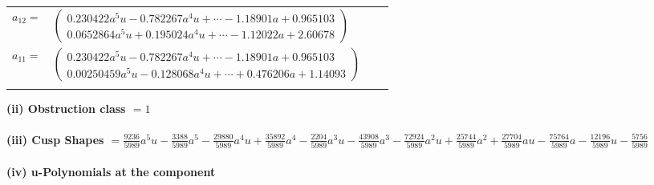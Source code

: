 \documentclass[1p]{elsarticle_modified}
\theoremstyle{definition}
\begin{document}
\begin{tabular}{m{7pt} m{180pt} m{7pt} m{180pt} }
\flushright $a_{12}=$&$\begin{pmatrix}0.230422 a^{5} u-0.782267 a^{4} u+\cdots-1.18901 a+0.965103\\0.0652864 a^{5} u+0.195024 a^{4} u+\cdots-1.12022 a+2.60678\end{pmatrix}$ \\
\flushright $a_{11}=$&$\begin{pmatrix}0.230422 a^{5} u-0.782267 a^{4} u+\cdots-1.18901 a+0.965103\\0.00250459 a^{5} u-0.128068 a^{4} u+\cdots+0.476206 a+1.14093\end{pmatrix}$\\&\end{tabular}
\flushleft \textbf{(ii) Obstruction class $= 1$}\\~\\
\flushleft \textbf{(iii) Cusp Shapes $= \frac{9236}{5989} a^5 u-\frac{3388}{5989} a^5-\frac{29880}{5989} a^4 u+\frac{35892}{5989} a^4-\frac{2204}{5989} a^3 u-\frac{43908}{5989} a^3-\frac{72924}{5989} a^2 u+\frac{25744}{5989} a^2+\frac{27704}{5989} a u-\frac{75764}{5989} a-\frac{12196}{5989} u-\frac{5756}{5989}$}\\~\\
\newpage\renewcommand{\arraystretch}{1}
\flushleft \textbf{(iv) u-Polynomials at the component}\newline \\
\end{document}
